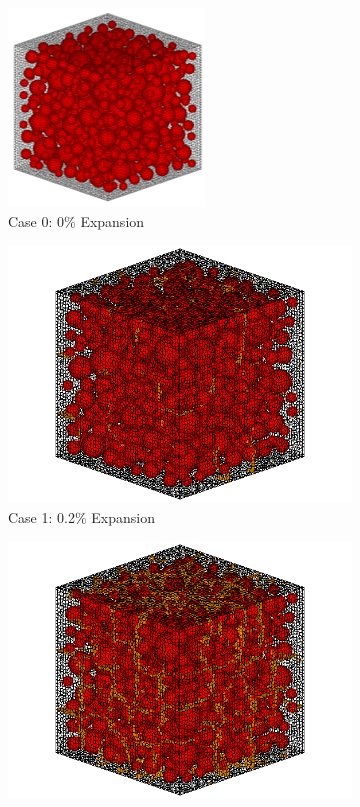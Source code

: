 \begin{figure}[ht!]
\centering

    \begin{subfigure}{.5\textwidth}
      \centering
      \includegraphics[width=.6\linewidth]{Files/exp_3D/A30Undamaged.png}
    \caption{Case 0: 0\% Expansion}
    \end{subfigure}%
    \begin{subfigure}{.5\textwidth}
      \centering
      \includegraphics[width=.8\linewidth]{Files/exp_3D/DEF/A30X-1C_1_c.png}
    \caption{Case 1: 0.2\% Expansion}
    \end{subfigure}
    \begin{subfigure}{.5\textwidth}
      \centering
      \includegraphics[width=.8\linewidth]{Files/exp_3D/DEF/A30X-1C_2_c.png}

\end{subfigure}
\end{figure}
